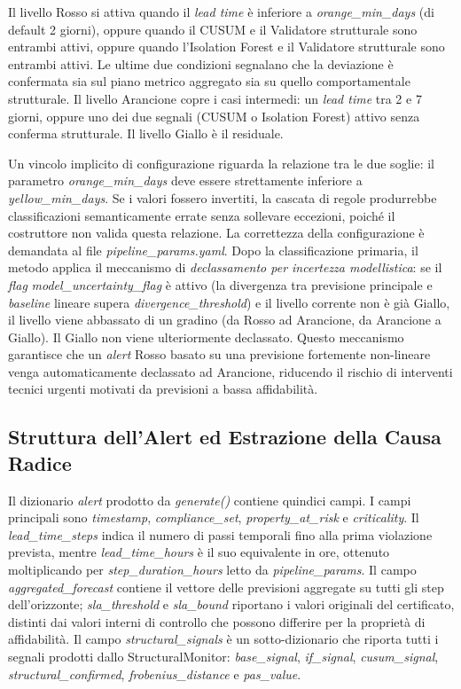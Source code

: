 Il livello Rosso si attiva quando il \textit{lead time} è inferiore a \textit{orange\_min\_days}
(di default 2 giorni), oppure quando il \gls{CUSUM} e il Validatore strutturale sono entrambi
attivi, oppure quando l'Isolation Forest e il Validatore strutturale sono entrambi attivi. Le
ultime due condizioni segnalano che la deviazione è confermata sia sul piano metrico aggregato
sia su quello comportamentale strutturale. Il livello Arancione copre i casi intermedi: un
\textit{lead time} tra 2 e 7 giorni, oppure uno dei due segnali (\gls{CUSUM} o Isolation Forest)
attivo senza conferma strutturale. Il livello Giallo è il residuale.

Un vincolo implicito di configurazione riguarda la relazione tra le due soglie: il parametro
\textit{orange\_min\_days} deve essere strettamente inferiore a \textit{yellow\_min\_days}.
Se i valori fossero invertiti, la cascata di regole produrrebbe classificazioni semanticamente
errate senza sollevare eccezioni, poiché il costruttore non valida questa relazione. La
correttezza della configurazione è demandata al file \textit{pipeline\_params.yaml}.
Dopo la classificazione primaria, il metodo applica il meccanismo di \textit{declassamento per
incertezza modellistica}: se il \textit{flag} \textit{model\_uncertainty\_flag} è attivo (la
divergenza tra previsione principale e \textit{baseline} lineare supera
\textit{divergence\_threshold}) e il livello corrente non è già Giallo, il livello viene abbassato
di un gradino (da Rosso ad Arancione, da Arancione a Giallo). Il Giallo non viene ulteriormente
declassato. Questo meccanismo garantisce che un \textit{alert} Rosso basato su una previsione
fortemente non-lineare venga automaticamente declassato ad Arancione, riducendo il rischio di
interventi tecnici urgenti motivati da previsioni a bassa affidabilità.

\subsection{Struttura dell'Alert ed Estrazione della Causa Radice}
\label{subsec:alert_structure}

Il dizionario \textit{alert} prodotto da \textit{generate()} contiene quindici campi. I campi
principali sono \textit{timestamp}, \textit{compliance\_set}, \textit{property\_at\_risk} e
\textit{criticality}. Il \textit{lead\_time\_steps} indica il numero di passi temporali fino alla
prima violazione prevista, mentre \textit{lead\_time\_hours} è il suo equivalente in ore,
ottenuto moltiplicando per \textit{step\_duration\_hours} letto da \textit{pipeline\_params}.
Il campo \textit{aggregated\_forecast} contiene il vettore delle previsioni aggregate su
tutti gli step dell'orizzonte; \textit{sla\_threshold} e \textit{sla\_bound} riportano i valori
originali del certificato, distinti dai valori interni di controllo che possono differire per la
proprietà di affidabilità. Il campo \textit{structural\_signals} è un sotto-dizionario che riporta
tutti i segnali prodotti dallo StructuralMonitor: \textit{base\_signal}, \textit{if\_signal},
\textit{cusum\_signal}, \textit{structural\_confirmed}, \textit{frobenius\_distance} e
\textit{pas\_value}.

